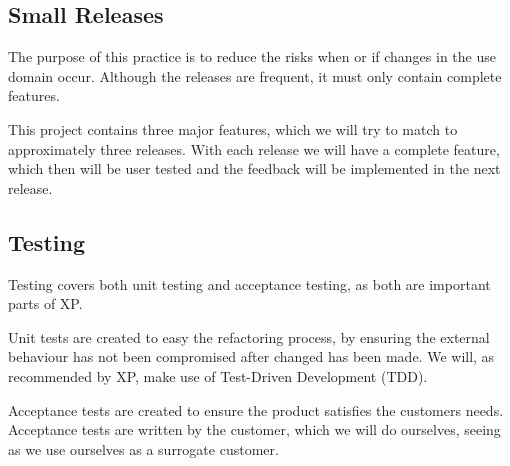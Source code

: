 \subsection{Small Releases}
The purpose of this practice is to reduce the risks when or if changes in the use domain occur.
Although the releases are frequent, it must only contain complete features.

This project contains three major features, which we will try to match to approximately three releases.
With each release we will have a complete feature, which then will be user tested and the feedback will be implemented in the next release.

\subsection{Testing}
Testing covers both unit testing and acceptance testing, as both are important parts of XP.

Unit tests are created to easy the refactoring process, by ensuring the external behaviour has not been compromised after changed has been made.
We will, as recommended by XP, make use of Test-Driven Development (TDD).

Acceptance tests are created to ensure the product satisfies the customers needs.
Acceptance tests are written by the customer, which we will do ourselves, seeing as we use ourselves as a surrogate customer.

